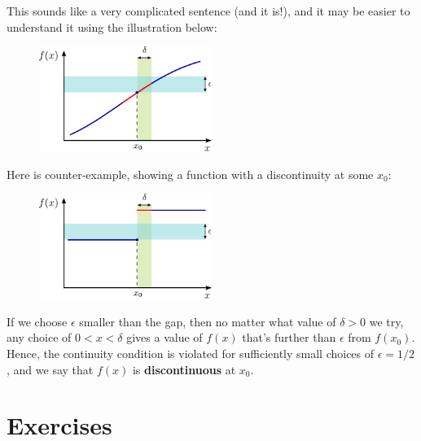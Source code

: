 \documentclass[10pt,a4paper]{article}
\begin{document}
This sounds like a very complicated sentence (and it is!), and it may
be easier to understand it using the illustration below:

\begin{figure}[h]
  \centering\includegraphics[width=0.5\textwidth]{continuity}
\end{figure}

\noindent    
Here is counter-example, showing a function with a discontinuity at
some $x_0$:

\begin{figure}[h]
  \centering\includegraphics[width=0.5\textwidth]{discontinuity}
\end{figure}

\noindent
If we choose $\epsilon$ smaller than the gap, then no matter what
value of $\delta > 0$ we try, any choice of $0 < x < \delta$ gives a
value of $f(x)$ that's further than $\epsilon$ from $f(x_0)$. Hence,
the continuity condition is violated for sufficiently small choices of
$\epsilon = 1/2$, and we say that $f(x)$ is \textbf{discontinuous} at
$x_0$.

\section{Exercises}\label{exercises}
\end{document}
